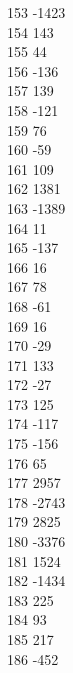 { 153	-1423 \\
 154	143 \\
 155	44 \\
 156	-136 \\
 157	139 \\
 158	-121 \\
 159	76 \\
 160	-59 \\
 161	109 \\
 162	1381 \\
 163	-1389 \\
 164	11 \\
 165	-137 \\
 166	16 \\
 167	78 \\
 168	-61 \\
 169	16 \\
 170	-29 \\
 171	133 \\
 172	-27 \\
 173	125 \\
 174	-117 \\
 175	-156 \\
 176	65 \\
 177	2957 \\
 178	-2743 \\
 179	2825 \\
 180	-3376 \\
 181	1524 \\
 182	-1434 \\
 183	225 \\
 184	93 \\
 185	217 \\
 186	-452 \\
}
